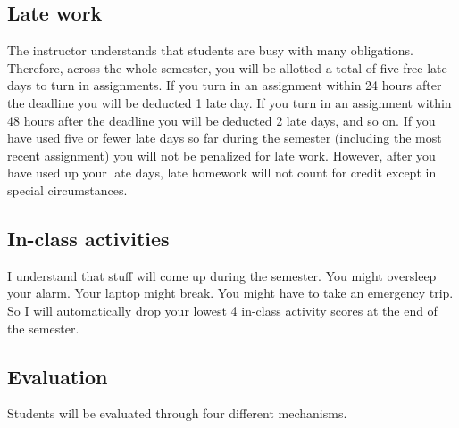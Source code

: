 \documentclass[10pt]{memoir}
\begin{document}
\subsection{Late work}
The instructor understands that students are busy with many obligations. 
Therefore, across the whole semester, you will be allotted a total of five free late days to turn in assignments. 
If you turn in an assignment within 24 hours after the deadline you will be deducted 1 late day. 
If you turn in an assignment within 48 hours after the deadline you will be deducted 2 late days, and so on. 
If you have used five or fewer late days so far during the semester (including the most recent assignment) you will not be penalized for late work. 
However, after you have used up your late days, late homework will not count for credit except in special circumstances.

\subsection{In-class activities}
I understand that stuff will come up during the semester. You might oversleep your alarm. Your laptop might break. You might have to take an emergency trip. So I will automatically drop your lowest 4 in-class activity scores at the end of the semester.

\subsection{Evaluation} 
Students will be evaluated through four different mechanisms. 
\end{document}
